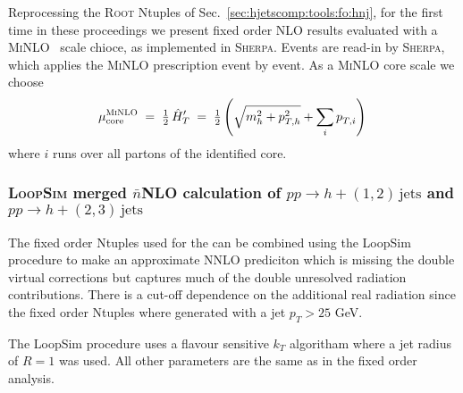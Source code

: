 Reprocessing the \textsc{Root} Ntuples of Sec.\ 
\ref{sec:hjetscomp:tools:fo:hnj}, for the first time in these 
proceedings we present fixed order NLO results evaluated with a
\textsc{MiNLO}~\cite{Hamilton:2012np} scale chioce, as implemented in
\textsc{Sherpa}. Events are read-in by \textsc{Sherpa}, which applies
the \textsc{MiNLO} prescription event by event. As a \textsc{MiNLO}
core scale we choose
\begin{equation}
  \mu_\text{core}^\text{\textsc{MiNLO}}
  \;=\;\tfrac{1}{2}\,\hat{H}^\prime_T
  \;=\;\tfrac{1}{2}\left(\sqrt{m_h^{2}+p_{T,h}^{2}}
       +\sum_{i}p_{T,i}^{}\right)\,
\end{equation}
where $i$ runs over all partons of the identified core.

\subsubsection{\textsc{LoopSim} merged $\bar{n}$NLO calculation of $pp\to h+(1,2)\,\text{jets}$ and $pp\to h+(2,3)\,\text{jets}$}
\label{sec:hjetscomp:tools:fo:hnjloopsim}

The fixed order Ntuples used for the can be combined using the LoopSim procedure to make
an approximate NNLO prediciton which is missing the double virtual corrections but captures
much of the double unresolved radiation contributions. There is a cut-off dependence on the
additional real radiation since the fixed order Ntuples where generated with a jet $p_T>25$ GeV.

The LoopSim procedure uses a flavour sensitive $k_T$ algoritham where a jet radius of $R=1$ was used.
All other parameters are the same as in the fixed order analysis.
